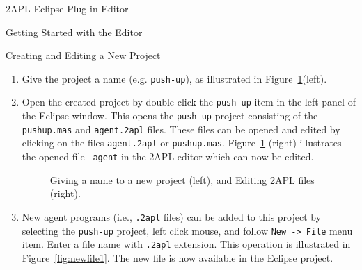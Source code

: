 \begin{section}{2APL Eclipse Plug-in Editor}
\begin{section}{Getting Started with the Editor}
\begin{subsection}{Creating and Editing a New Project}
\begin{enumerate}
        \item Give the project a name (e.g. \texttt{push-up}), as
        illustrated in Figure~\ref{fig:usage3}(left).

        \item Open the created project by double click the {\tt push-up} item in the left panel of the Eclipse window.
        This opens the {\tt push-up} project consisting of the \texttt{pushup.mas} and {\tt agent.2apl}
        files. These files can be opened and edited by clicking on
        the files {\tt agent.2apl} or {\tt pushup.mas}.
        Figure~\ref{fig:usage3} (right) illustrates the opened file {\tt
        agent} in the 2APL editor which can now be edited.

        \begin{figure}[ht]
            \begin{minipage}{0.3\linewidth}
                \begin{center}
                \end{center}
            \end{minipage}
            \hspace{.5cm}
            \begin{minipage}{0.6\linewidth}
            \begin{center}
            \end{center}
            \end{minipage}
        \caption{Giving a name to a new project (left), and Editing 2APL files (right).}\label{fig:usage3}
        \end{figure}

        \item New agent programs (i.e., {\tt .2apl} files) can be added to this project by
        selecting the {\tt push-up} project, left click mouse, and
        follow {\tt New -> File} menu item. Enter a file name with
        {\tt .2apl} extension. This operation is illustrated in
        Figure~\ref{fig:newfile1}. The new file is now available in the Eclipse project.


\end{enumerate}
\end{subsection}
\end{section}
\end{section}
